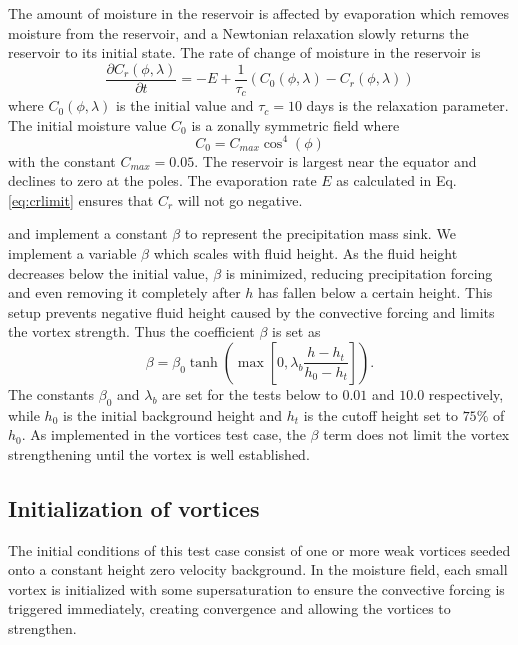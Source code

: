 \documentclass{ametsoc}
\begin{document}
    The amount of moisture in the reservoir is affected by
    evaporation which removes moisture from 
    the reservoir, and a Newtonian relaxation slowly returns the reservoir to its initial state. 
    The rate of change of moisture in the reservoir is
    \begin{equation}
        \label{eq:ocean} 
        \frac{\partial C_r(\phi,\lambda)}{\partial t} = - E + \frac{1}{\tau_c}(C_0(\phi,\lambda) - C_r(\phi,\lambda))
    \end{equation}
    where $C_0(\phi,\lambda)$ is the initial value and $\tau_c = 10$ days 
    is the relaxation parameter. The initial moisture value $C_0$
    is a zonally symmetric field where
   \begin{equation}
     \label{eq:s0} C_0 = C_{max} \cos^4(\phi)
   \end{equation}
   with the constant $C_{max}= 0.05$. The reservoir is largest near the equator and 
   declines to zero at the poles.  The evaporation rate $E$ as calculated in Eq. \ref{eq:crlimit} 
   ensures that $C_r$ will not go negative.
   
    \cite{bouchut2009fronts} and \cite{lahaye2016understanding} implement a constant 
    $\beta$ to represent the precipitation mass sink. We implement a variable $\beta$ which scales with
    fluid height. As the fluid height decreases below the initial value, $\beta$ is 
    minimized, reducing precipitation forcing and even removing it completely after $h$ has fallen below a certain height. 
    This setup prevents negative fluid height caused by the convective forcing
    and limits the vortex strength.
    Thus the coefficient $\beta$ is set as 
  \begin{equation}
    \label{eq:beta} 
    \beta = \beta_0 \tanh\left(\max\left[0, \lambda_b \frac{h - h_t}{h_0 - h_t}\right]\right).
  \end{equation}
   The constants $\beta_0$ and $\lambda_b$ are set for the tests below to $0.01$ and $10.0$ respectively, 
   while $h_0$ is the initial background height and $h_t$ is the cutoff height set to $75\%$ of $h_0$.
   As implemented in the vortices test case, the $\beta$ term does not limit the vortex strengthening
   until the vortex is well established.

  \subsection{Initialization of vortices}
  The initial conditions of this test case consist of
  one or more weak vortices seeded onto a constant height zero velocity background.
  In the moisture field, each small vortex is initialized with some supersaturation
  to ensure the convective forcing is triggered immediately, creating convergence 
  and allowing the vortices to strengthen.
  
\end{document}
